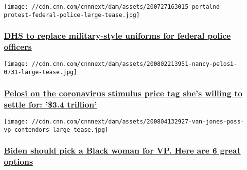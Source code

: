 \href{/2020/08/04/politics/dhs-replace-military-style-uniforms/index.html}{}

\texttt{[image: //cdn.cnn.com/cnnnext/dam/assets/200727163015-portalnd-protest-federal-police-large-tease.jpg]}

\hypertarget{dhs-to-replace-military-style-uniforms-for-federal-police-officers}{%
\subsubsection{\texorpdfstring{\href{/2020/08/04/politics/dhs-replace-military-style-uniforms/index.html}{DHS
to replace military-style uniforms for federal police
officers}}{DHS to replace military-style uniforms for federal police officers}}\label{dhs-to-replace-military-style-uniforms-for-federal-police-officers}}

\href{/2020/08/04/politics/pelosi-stimulus-negotiation/index.html}{}

\texttt{[image: //cdn.cnn.com/cnnnext/dam/assets/200802213951-nancy-pelosi-0731-large-tease.jpg]}

\hypertarget{pelosi-on-the-coronavirus-stimulus-price-tag-shes-willing-to-settle-for-34-trillion}{%
\subsubsection{\texorpdfstring{\href{/2020/08/04/politics/pelosi-stimulus-negotiation/index.html}{Pelosi
on the coronavirus stimulus price tag she's willing to settle for:
'\$3.4
trillion'}}{Pelosi on the coronavirus stimulus price tag she's willing to settle for: '\$3.4 trillion'}}\label{pelosi-on-the-coronavirus-stimulus-price-tag-shes-willing-to-settle-for-34-trillion}}

\href{/2020/08/04/opinions/black-women-biden-vice-president-jones/index.html}{}

\texttt{[image: //cdn.cnn.com/cnnnext/dam/assets/200804132927-van-jones-poss-vp-contendors-large-tease.jpg]}

\hypertarget{biden-should-pick-a-black-woman-for-vp-here-are-6-great-options}{%
\subsubsection{\texorpdfstring{\href{/2020/08/04/opinions/black-women-biden-vice-president-jones/index.html}{Biden
should pick a Black woman for VP. Here are 6 great
options}}{Biden should pick a Black woman for VP. Here are 6 great options}}\label{biden-should-pick-a-black-woman-for-vp-here-are-6-great-options}}

